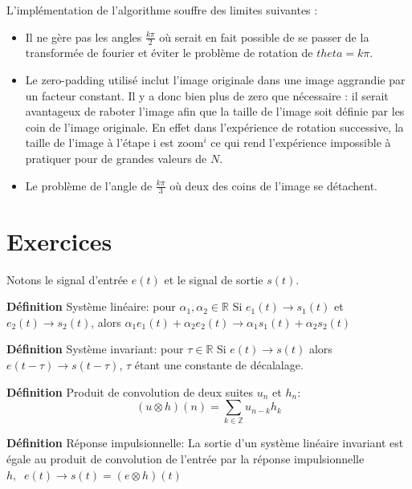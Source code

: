 \documentclass[12pt]{article}
\begin{document}
L'implémentation de l'algorithme souffre des limites suivantes : 
\begin{itemize}

\item Il ne gère pas les angles $\frac{k\pi}{2}$ où serait en fait possible de se passer de la transformée de fourier et éviter le problème de rotation de $theta =  k\pi$.
\item Le zero-padding utilisé  inclut l'image originale dans une image aggrandie par un facteur constant. Il y a donc bien plus de zero que nécessaire : il serait avantageux de raboter l'image afin que la taille de l'image soit définie par les coin de l'image originale. En effet dans l'expérience de rotation successive, la taille de l'image à l'étape i est zoom$^i$ ce qui rend l'expérience impossible à pratiquer pour de grandes valeurs de $N$.
\item Le problème de l'angle de $\frac{k\pi}{3}$ où deux des coins de l'image se détachent.

\end{itemize}

\section{Exercices}

Notons le signal d'entrée $e(t)$ et le signal de sortie $s(t)$.


\textbf{Définition} Système linéaire: pour $\alpha_1, \alpha_2 \in \mathbb{R}$\newline
Si $e_1(t) \rightarrow s_1(t)$ et $e_2(t) \rightarrow s_2(t)$, alors $\alpha_1 e_1(t) + \alpha_2 e_2(t) \rightarrow \alpha_1 s_1(t) + \alpha_2 s_2(t)$

\textbf{Définition} Système invariant: pour $\tau \in \mathbb{R}$ \newline
Si $e(t) \rightarrow s(t)$ alors $e(t-\tau) \rightarrow s(t-\tau)$, $\tau$ étant une constante de décalalage.

\textbf{Définition} Produit de convolution de deux suites $u_n$ et $h_n$: \newline
$$ (u \otimes h)(n) = \sum_{k \in \mathbb{Z}} u_{n-k}h_k $$

\textbf{Définition} Réponse impulsionnelle: \newline
La sortie d'un système linéaire invariant est égale au produit de convolution de l'entrée par la réponse impulsionnelle $h, \;\;e(t) \longrightarrow s(t) = (e \otimes h)(t)$
\end{document}
